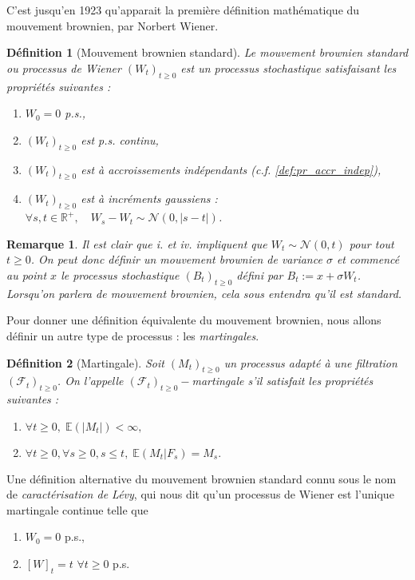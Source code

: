 \documentclass[openany]{book}
\newcommand{\F}{\mathscr{F}}
\newcommand{\R}{\mathbb{R}}
\newcommand{\E}{\mathbb{E}}
\newcommand{\1}{\mathbbm{1}}
\theoremstyle{thmfont}
\theoremstyle{deffont}
\newtheorem{definition}[definition]{Définition}
\theoremstyle{thmfont}
\theoremstyle{deffont}
\newtheorem{remark}[remark]{Remarque}
\begin{document}
C'est jusqu'en 1923 qu'apparait la première définition mathématique du mouvement brownien, par Norbert Wiener.\\

\begin{definition}[Mouvement brownien standard]  \label{def:MvtBorwnien}
  Le \textit{mouvement brownien standard} ou \textit{processus de Wiener} $(W_t)_{t\geq0}$ est un processus stochastique satisfaisant les propriétés suivantes :
  \begin{enumerate}
  \item $W_0 = 0$ p.s.,
  \item $(W_t)_{t\geq0}$ est p.s. continu,
  \item $(W_t)_{t\geq0}$ est à accroissements indépendants (c.f. \autoref{def:pr_accr_indep}),
  \item $(W_t)_{t \geq 0}$ est à incréments gaussiens : $\forall s, t \in \R^+,\quad W_s - W_t \sim \mathcal{N}(0,|s-t|)$.
  \end{enumerate}
\end{definition}

\begin{remark}
  Il est clair que \textit{i.} et \textit{iv.} impliquent que $W_t \sim \mathcal{N}(0,t)$ pour tout $t \geq 0$. On peut donc définir un mouvement brownien de variance $\sigma$ et commencé au point $x$ le processus stochastique $(B_t)_{t\geq0}$ défini par $B_t := x + \sigma W_t$. Lorsqu'on parlera de mouvement brownien, cela sous entendra qu'il est standard.
\end{remark}

Pour donner une définition équivalente du mouvement brownien, nous allons définir un autre type de processus : les \textit{martingales}.

  \begin{definition}[Martingale]
  Soit $(M_t)_{t\geq0}$ un processus adapté à une filtration $(\F_t)_{t\geq0}$. On l'appelle $(\F_t)_{t\geq0}-$\textit{martingale} s'il satisfait les propriétés suivantes : 
  \begin{enumerate}
  \item $\forall t\geq 0,\;\E\left(|M_t|\right) < \infty,$
  \item $\forall t\geq 0, \forall s \geq 0, s \leq t,\;\E\left(M_t|F_s\right) = M_s.$
  \end{enumerate}
  \end{definition}
Une définition alternative du mouvement brownien standard connu sous le nom de \textit{caractérisation de Lévy}, qui nous dit qu'un processus de Wiener est l'unique martingale continue telle que
\begin{enumerate}
\item $W_0 = 0$ p.s.,
\item $[W]_t = t$ $\forall t\geq0$ p.s.
  \label{def:MvtBorwnien_caractLevy}
\end{enumerate}
\end{document}
